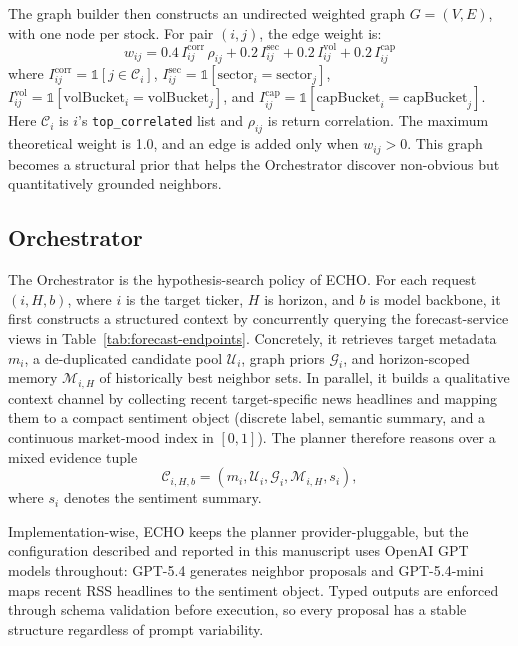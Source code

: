 \documentclass[12pt,a4paper,titlepage]{article}
\begin{document}
The graph builder then constructs an undirected weighted graph \(G=(V,E)\), with one node per stock. For pair \((i,j)\), the edge weight is:
\[
w_{ij} = 0.4\,I^{\mathrm{corr}}_{ij}\,\rho_{ij}
      + 0.2\,I^{\mathrm{sec}}_{ij}
      + 0.2\,I^{\mathrm{vol}}_{ij}
      + 0.2\,I^{\mathrm{cap}}_{ij}
\]
where \(I^{\mathrm{corr}}_{ij} = \mathbb{1}[j \in \mathcal{C}_i]\), \(I^{\mathrm{sec}}_{ij} = \mathbb{1}[\mathrm{sector}_i = \mathrm{sector}_j]\), \(I^{\mathrm{vol}}_{ij} = \mathbb{1}[\mathrm{volBucket}_i = \mathrm{volBucket}_j]\), and \(I^{\mathrm{cap}}_{ij} = \mathbb{1}[\mathrm{capBucket}_i = \mathrm{capBucket}_j]\). Here \(\mathcal{C}_i\) is \(i\)'s \texttt{top\_correlated} list and \(\rho_{ij}\) is return correlation. The maximum theoretical weight is 1.0, and an edge is added only when \(w_{ij} > 0\). This graph becomes a structural prior that helps the Orchestrator discover non-obvious but quantitatively grounded neighbors.

\subsection{Orchestrator}

The Orchestrator is the hypothesis-search policy of ECHO. For each request \((i,H,b)\), where \(i\) is the target ticker, \(H\) is horizon, and \(b\) is model backbone, it first constructs a structured context by concurrently querying the forecast-service views in Table~\ref{tab:forecast-endpoints}. Concretely, it retrieves target metadata \(m_i\), a de-duplicated candidate pool \(\mathcal{U}_i\), graph priors \(\mathcal{G}_i\), and horizon-scoped memory \(\mathcal{M}_{i,H}\) of historically best neighbor sets. In parallel, it builds a qualitative context channel by collecting recent target-specific news headlines and mapping them to a compact sentiment object (discrete label, semantic summary, and a continuous market-mood index in \([0,1]\)). The planner therefore reasons over a mixed evidence tuple
\[
\mathcal{C}_{i,H,b}=\left(m_i,\mathcal{U}_i,\mathcal{G}_i,\mathcal{M}_{i,H},s_i\right),
\]
where \(s_i\) denotes the sentiment summary.

Implementation-wise, ECHO keeps the planner provider-pluggable, but the configuration described and reported in this manuscript uses OpenAI GPT models throughout: GPT-5.4 generates neighbor proposals and GPT-5.4-mini maps recent RSS headlines to the sentiment object. Typed outputs are enforced through schema validation before execution, so every proposal has a stable structure regardless of prompt variability.
\end{document}

